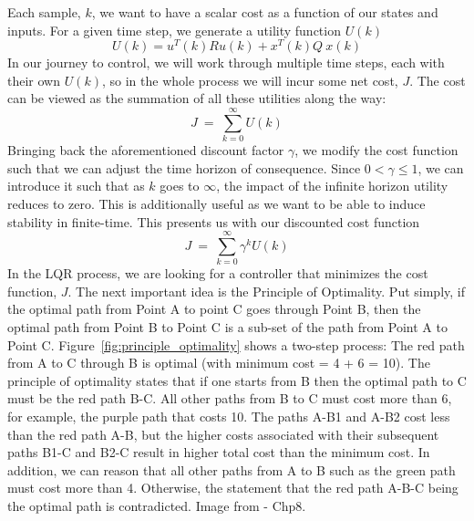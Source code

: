 Each sample, $k$, we want to have a scalar cost as a function of our states and inputs. For a given time step, we generate a utility function $U\left(k\right)$
\begin{equation}
    U\left(k\right)=u^T\left(k\right)Ru\left(k\right)+x^T\left(k\right)Q\ x\left(k\right)
    \label{eq:utility_function}
\end{equation}
In our journey to control, we will work through multiple time steps, each with their own $U\left(k\right)$, so in the whole process we will incur some net cost, $J$. The cost can be viewed as the summation of all these utilities along the way:
\begin{equation}
    J\ =\ \sum_{k=0}^{\infty}U\left(k\right)
    \label{eq:cost_function}
\end{equation}
Bringing back the aforementioned discount factor $\gamma$, we modify the cost function such that we can adjust the time horizon of consequence. Since $0<\gamma \le 1$, we can introduce it such that as $k$ goes to $\infty$, the impact of the infinite horizon utility reduces to zero. This is additionally useful as we want to be able to induce stability in finite-time. This presents us with our discounted cost function
\begin{equation}
    J\ =\ \sum_{k=0}^{\infty}{\gamma ^k U\left(k\right)}
    \label{eq:discounted_cost_function}
\end{equation}
In the LQR process, we are looking for a controller that minimizes the cost function, $J$.
The next important idea is the Principle of Optimality. Put simply, if the optimal path from Point A to point C goes through Point B, then the optimal path from Point B to Point C is a sub-set of the path from Point A to Point C. Figure~\ref{fig:principle_optimality} shows a two-step process: The red path from A to C through B is optimal (with minimum cost = 4 + 6 = 10). The principle of optimality states that if one starts from B then the optimal path to C must be the red path B-C. All other paths from B to C must cost more than 6, for example, the purple path that costs 10. The paths A-B1 and A-B2 cost less than the red path A-B, but the higher costs associated with their subsequent paths B1-C and B2-C result in higher total cost than the minimum cost. In addition, we can reason that all other paths from A to B such as the green path must cost more than 4. Otherwise, the statement that the red path A-B-C being the optimal path is contradicted. 
Image from \cite{Phan2025} - Chp8.
